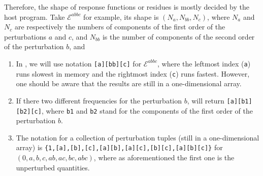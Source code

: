 \begin{description}
    Therefore, the shape of response functions or residues is mostly decided
    by the host program. Take $\mathcal{E}^{abbc}$ for example, its shape is
    $(N_{a},N_{bb},N_{c})$, where $N_{a}$ and $N_{c}$ are respectively the
    numbers of components of the first order of the perturbations $a$ and $c$,
    and $N_{bb}$ is the number of components of the second order of the
    perturbation $b$, and
    \begin{enumerate}
      \item In \LibName, we will use notation \texttt{[a][bb][c]} for
        $\mathcal{E}^{abbc}$, where the leftmost index (\texttt{a}) runs
        slowest in memory and the rightmost index (\texttt{c}) runs fastest.
        However, one should be aware that the results are still in a
        one-dimensional array.
      \item If there two different frequencies for the perturbation $b$,
        \LibName will return \texttt{[a][b1][b2][c]}, where \texttt{b1}
        and \texttt{b2} stand for the components of the first order of
        the perturbation $b$.
      \item The notation for a collection of perturbation tuples (still in a
        one-dimensional array) is
        \texttt{\{1,[a],[b],[c],[a][b],[a][c],[b][c],[a][b][c]\}}
        for $(0,a,b,c,ab,ac,bc,abc)$, where as aforementioned the first one is
        the unperturbed quantities.
    \end{enumerate}
\end{description}

